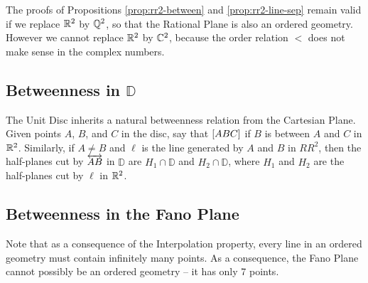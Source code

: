 The proofs of Propositions \ref{prop:rr2-between} and \ref{prop:rr2-line-sep} remain valid if we replace \(\mathbb{R}^2\) by \(\mathbb{Q}^2\), so that the Rational Plane is also an ordered geometry.
However we cannot replace \(\mathbb{R}^2\) by \(\mathbb{C}^2\), because the order relation \(<\) does not make sense in the complex numbers.


\subsection{Betweenness in \(\mathbb{D}\)}

The Unit Disc inherits a natural betweenness relation from the Cartesian Plane.
Given points \(A\), \(B\), and \(C\) in the disc, say that \([ A B C ]\) if \(B\) is between \(A\) and \(C\) in \(\mathbb{R}^2\).
Similarly, if \(A \neq B\) and \(\ell\) is the line generated by \(A\) and \(B\) in \(RR^2\), then the half-planes cut by \(\overleftrightarrow{AB}\) in \(\mathbb{D}\) are \(H_1 \cap \mathbb{D}\) and \(H_2 \cap \mathbb{D}\), where \(H_1\) and \(H_2\) are the half-planes cut by \(\ell\) in \(\mathbb{R}^2\).


\subsection{Betweenness in the Fano Plane}

Note that as a consequence of the Interpolation property, every line in an ordered geometry must contain infinitely many points.
As a consequence, the Fano Plane cannot possibly be an ordered geometry -- it has only 7 points.
